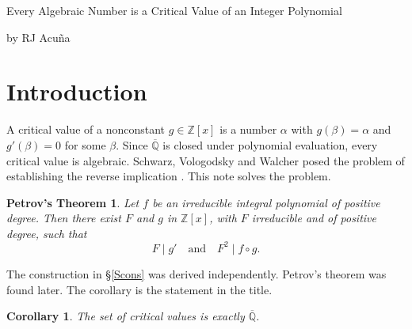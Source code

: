 \documentclass[10pt]{article}
\newcommand\Z{\mathbb{Z}}
\newcommand\Q{\mathbb{Q}}
\newcommand\1{\mathbb{1}}
\theoremstyle{plain}
\newtheorem*{ptheorem}{Petrov's Theorem}
\newtheorem{cor}{Corollary}
\theoremstyle{remark}
\theoremstyle{plain}
\begin{document}
\begin{center}
  {\Large \textsc Every Algebraic Number is a
    Critical Value of an Integer Polynomial}

  {by RJ Acu\~na}
\end{center}

\begin{center}
  \begin{minipage}{0.85\textwidth}
    \begin{abstract}
      \noindent
      \justifying
      We arrived at an independent proof of Petrov's theorem. For every
      irreducible $f \in \Z[x]$ of positive degree there are $g \in \Z[x]$
      and an irreducible $F \in \Z[x]$ of positive degree with
      $F \mid g'$ and $F^{2} \mid f \circ g$.
      Equivalently, every algebraic number is a critical value of an integer
      polynomial, so the set of critical values of $\Z[x]$ is exactly
      $\overline{\Q}$. The construction is explicit. We classify
      $g \in \Z[x]$ with critical value $\alpha$, and find a lower bound for
      $\deg g$. The proof was
      assisted by AI, and has been formalized in Lean.
    \end{abstract}
  \end{minipage}
\end{center}

\section{Introduction}

A critical value of a nonconstant $g \in \Z[x]$ is a number $\alpha$ with
$g(\beta) = \alpha$ and $g'(\beta) = 0$ for some $\beta$. Since $\overline{\Q}$ is
closed under polynomial evaluation, every critical value is algebraic.
Schwarz, Vologodsky and Walcher posed the problem of establishing the
reverse implication \cite{svw2017}.
This note solves the problem.

\begin{ptheorem}
  Let $f$ be an irreducible integral polynomial of positive degree. Then there
  exist $F$ and $g$ in $\Z[x]$, with $F$ irreducible and of positive degree,
  such that
  \[
    F \mid g' \quad\text{and}\quad F^{2} \mid f \circ g .
  \]
\end{ptheorem}

The construction in \S\ref{Scons} was derived independently. Petrov's theorem
\cite{petrov2021} was found later.
The corollary is the statement in the title.

\begin{cor}\label{C3}
  The set of critical values is exactly $\overline{\Q}$.
\end{cor}
\end{document}
